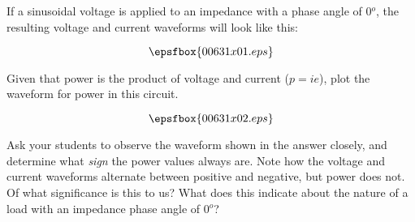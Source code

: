 

If a sinusoidal voltage is applied to an impedance with a phase angle of 0$^{o}$, the resulting voltage and current waveforms will look like this:

$$\epsfbox{00631x01.eps}$$

Given that power is the product of voltage and current ($p = i e$), plot the waveform for power in this circuit.







$$\epsfbox{00631x02.eps}$$







Ask your students to observe the waveform shown in the answer closely, and determine what {\it sign} the power values always are.  Note how the voltage and current waveforms alternate between positive and negative, but power does not.  Of what significance is this to us?  What does this indicate about the nature of a load with an impedance phase angle of 0$^{o}$?




